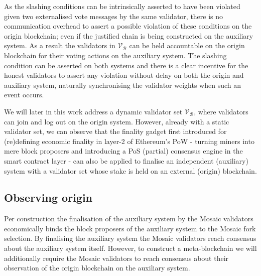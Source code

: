 \documentclass[12pt,a4paper]{article}
\begin{document}
As the slashing conditions can be intrinsically asserted to have been violated given two externalised vote messages by the same validator, there is no communication overhead to assert a possible violation of these conditions on the origin blockchain; even if the justified chain is being constructed on the auxiliary system.  As a result the validators in $\mathcal{V}_\mathcal{B}$ can be held accountable on the origin blockchain for their voting actions on the auxiliary system. The slashing condition can be asserted on both systems and there is a clear incentive for the honest validators to assert any violation without delay on both the origin and auxiliary system, naturally synchronising the validator weights when such an event occurs.

We will later in this work address a dynamic validator set $\mathcal{V}_\mathcal{B}$, where validators can join and log out on the origin system. However, already with a static validator set, we can observe that the finality gadget first introduced for (re)defining economic finality in layer-2 of Ethereum's PoW - turning miners into mere block proposers and introducing a PoS (partial) consensus engine in the smart contract layer - can also be applied to finalise an independent (auxiliary) system with a validator set whose stake is held on an external (origin) blockchain.


\subsection{Observing origin}

Per construction the finalisation of the auxiliary system by the Mosaic validators economically binds the block proposers of the auxiliary system to the Mosaic fork selection. By finalising the auxiliary system the Mosaic validators reach consensus about the auxiliary system itself. However, to construct a meta-blockchain we will additionally require the Mosaic validators to reach consensus about their observation of the origin blockchain on the auxiliary system.
\end{document}
